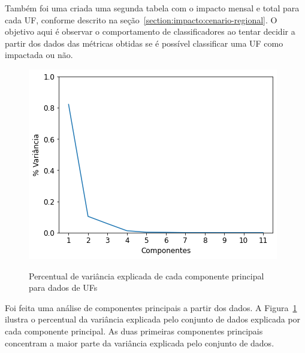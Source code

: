 Também foi uma criada uma segunda tabela com o impacto mensal e total para cada UF, conforme descrito na seção~\ref{section:impacto:cenario-regional}. O objetivo aqui é observar o comportamento de classificadores ao tentar decidir a partir dos dados das métricas obtidas se é possível classificar uma UF como impactada ou não.

\begin{figure}[htb]
	\centering
    \caption{Percentual de variância explicada de cada componente principal para dados de UFs}
    \includegraphics[scale=0.7]{images/base-de-dados-24.1-pca-components-monthly-uf.png}
    \label{fig:resultados:base-de-dados-24-pca-monthly-uf}
    \fdadospesquisa
\end{figure}

Foi feita uma análise de componentes principais a partir dos dados. A Figura~\ref{fig:resultados:base-de-dados-24-pca-monthly-uf} ilustra o percentual da variância explicada pelo conjunto de dados explicada por cada componente principal. As duas primeiras componentes principais concentram a maior parte da variância explicada pelo conjunto de dados.

